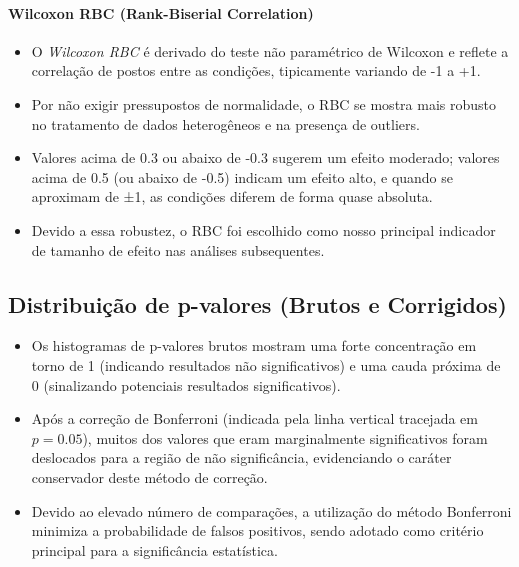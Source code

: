 \paragraph{Wilcoxon RBC (Rank-Biserial Correlation)}
\begin{itemize}
    \item O \emph{Wilcoxon RBC} é derivado do teste não paramétrico de Wilcoxon e reflete a correlação de postos entre as condições, tipicamente variando de -1 a +1.
    \item Por não exigir pressupostos de normalidade, o RBC se mostra mais robusto no tratamento de dados heterogêneos e na presença de outliers.
    \item Valores acima de 0.3 ou abaixo de -0.3 sugerem um efeito moderado; valores acima de 0.5 (ou abaixo de -0.5) indicam um efeito alto, e quando se aproximam de ±1, as condições diferem de forma quase absoluta.
    \item Devido a essa robustez, o RBC foi escolhido como nosso principal indicador de tamanho de efeito nas análises subsequentes.
\end{itemize}

\subsection{Distribuição de p-valores (Brutos e Corrigidos)}

\begin{itemize}
    \item Os histogramas de p-valores brutos mostram uma forte concentração em torno de 1 (indicando resultados não significativos) e uma cauda próxima de 0 (sinalizando potenciais resultados significativos).
    \item Após a correção de Bonferroni (indicada pela linha vertical tracejada em \(p=0.05\)), muitos dos valores que eram marginalmente significativos foram deslocados para a região de não significância, evidenciando o caráter conservador deste método de correção.
    \item Devido ao elevado número de comparações, a utilização do método Bonferroni minimiza a probabilidade de falsos positivos, sendo adotado como critério principal para a significância estatística.
\end{itemize}


